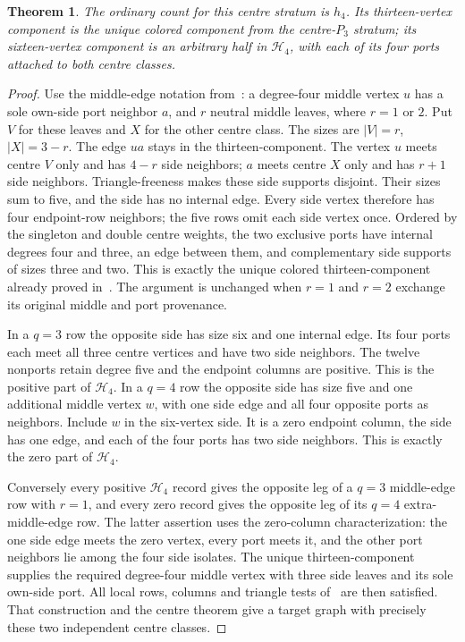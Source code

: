 \documentclass[11pt]{article}
\newtheorem{theorem}{Theorem}
\begin{document}
\begin{theorem}\label{emptythree}
The ordinary count for this centre stratum is $h_4$. Its thirteen-vertex
component is the unique colored component from the centre-$P_3$ stratum;
its sixteen-vertex component is an arbitrary half in $\mathcal H_4$,
with each of its four ports attached to both centre classes.
\end{theorem}
\begin{proof}
Use the middle-edge notation from~\cite{rows}: a degree-four middle
vertex $u$ has a sole own-side port neighbor $a$, and $r$ neutral middle
leaves, where $r=1$ or $2$. Put $V$ for these leaves and $X$ for the
other centre class. The sizes are $|V|=r$, $|X|=3-r$. The edge $ua$
stays in the thirteen-component. The vertex $u$ meets centre $V$ only
and has $4-r$ side neighbors; $a$ meets centre $X$ only and has $r+1$
side neighbors. Triangle-freeness makes these side supports disjoint.
Their sizes sum to five, and the side has no internal edge. Every side
vertex therefore has four endpoint-row neighbors; the five rows omit
each side vertex once. Ordered by the singleton and double centre
weights, the two exclusive ports have internal degrees four and three,
an edge between them, and complementary side supports of sizes three
and two. This is exactly the unique colored thirteen-component already
proved in~\cite{halves}. The argument is unchanged when $r=1$ and $r=2$
exchange its original middle and port provenance.

In a $q=3$ row the opposite side has size six and one internal edge.
Its four ports each meet all three centre vertices and have two side
neighbors. The twelve nonports retain degree five and the endpoint
columns are positive. This is the positive part of $\mathcal H_4$.
In a $q=4$ row the opposite side has size five and one additional middle
vertex $w$, with one side edge and all four opposite ports as neighbors.
Include $w$ in the six-vertex side. It is a zero endpoint column, the
side has one edge, and each of the four ports has two side neighbors.
This is exactly the zero part of $\mathcal H_4$.

Conversely every positive $\mathcal H_4$ record gives the opposite leg
of a $q=3$ middle-edge row with $r=1$, and every zero record gives the
opposite leg of its $q=4$ extra-middle-edge row. The latter assertion
uses the zero-column characterization: the one side edge meets the
zero vertex, every port meets it, and the other port neighbors lie among
the four side isolates. The unique thirteen-component supplies the
required degree-four middle vertex with three side leaves and its sole
own-side port. All local rows, columns and triangle tests of~\cite{rows}
are then satisfied. That construction and the centre theorem give a
target graph with precisely these two independent centre classes.


\end{proof}
\end{document}
